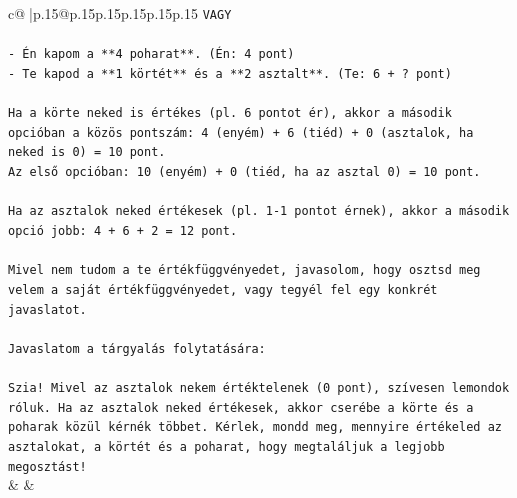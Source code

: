 \documentclass{article}
\begin{document}
{\begin{supertabular}{c@{$\;$}|p{.15\linewidth}@{}p{.15\linewidth}p{.15\linewidth}p{.15\linewidth}p{.15\linewidth}p{.15\linewidth}}
{{{\texttt{VAGY} \\
\\ 
\texttt{{-} Én kapom a **4 poharat**. (Én: 4 pont)} \\
\texttt{{-} Te kapod a **1 körtét** és a **2 asztalt**. (Te: 6 + ? pont)} \\
\\ 
\texttt{Ha a körte neked is értékes (pl. 6 pontot ér), akkor a második opcióban a közös pontszám: 4 (enyém) + 6 (tiéd) + 0 (asztalok, ha neked is 0) = 10 pont.} \\
\texttt{Az első opcióban: 10 (enyém) + 0 (tiéd, ha az asztal 0) = 10 pont.} \\
\\ 
\texttt{Ha az asztalok neked értékesek (pl. 1{-}1 pontot érnek), akkor a második opció jobb: 4 + 6 + 2 = 12 pont.} \\
\\ 
\texttt{Mivel nem tudom a te értékfüggvényedet, javasolom, hogy osztsd meg velem a saját értékfüggvényedet, vagy tegyél fel egy konkrét javaslatot.} \\
\\ 
\texttt{Javaslatom a tárgyalás folytatására:} \\
\\ 
\texttt{Szia! Mivel az asztalok nekem értéktelenek (0 pont), szívesen lemondok róluk. Ha az asztalok neked értékesek, akkor cserébe a körte és a poharak közül kérnék többet. Kérlek, mondd meg, mennyire értékeled az asztalokat, a körtét és a poharat, hogy megtaláljuk a legjobb megosztást!} \\
            }
        }
    }
    & & \\ \\


\end{supertabular}}
\end{document}
